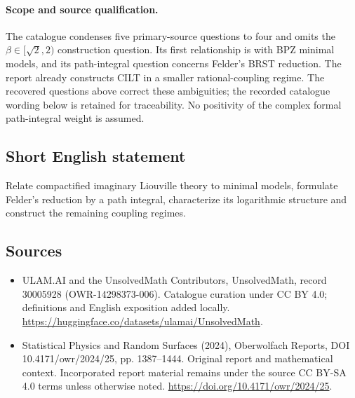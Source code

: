 \documentclass[11pt]{article}
\begin{document}
\paragraph{Scope and source qualification.}The catalogue condenses five primary-source questions to four and omits the $\beta\in[\sqrt2,2)$ construction question. Its first relationship is with BPZ minimal models, and its path-integral question concerns Felder's BRST reduction. The report already constructs CILT in a smaller rational-coupling regime. The recovered questions above correct these ambiguities; the recorded catalogue wording below is retained for traceability. No positivity of the complex formal path-integral weight is assumed.
\subsection{Short English statement}
Relate compactified imaginary Liouville theory to minimal models, formulate Felder's reduction by a path integral, characterize its logarithmic structure and construct the remaining coupling regimes.
\subsection{Sources}
\begin{itemize}
\item[\hypertarget{source:30005928:1}{S1}] ULAM.AI and the UnsolvedMath Contributors, UnsolvedMath, record 30005928 (OWR-14298373-006). Catalogue curation under CC BY 4.0; definitions and English exposition added locally.
\url{https://huggingface.co/datasets/ulamai/UnsolvedMath}.
\item[\hypertarget{source:30005928:2}{S2}] Statistical Physics and Random Surfaces (2024), Oberwolfach Reports, DOI 10.4171/owr/2024/25, pp. 1387--1444. Original report and mathematical context. Incorporated report material remains under the source CC BY-SA 4.0 terms unless otherwise noted.
\url{https://doi.org/10.4171/owr/2024/25}.
\end{itemize}
\label{end:30005928}
\end{document}
